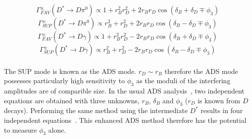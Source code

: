 \documentclass[oneside,12pt]{article}
\begin{document}
  \begin{equation}
		\Gamma_{FAV}^{\pm}(D^{*}\rightarrow D\pi^{0})\propto 1 + r_{B}^{2}r_{D}^{2} + 2r_{B}r_{D}\cos(\delta_{B} + \delta_{D} \mp \phi_{3})
    \label{eq:DecayRateADSFAVpi0}
  \end{equation}
  \begin{equation}
		\Gamma_{SUP}^{\pm}(D^{*}\rightarrow D\pi^{0})\propto r_{B}^{2} + r_{D}^{2} + 2r_{B}r_{D}\cos(\delta_{B} - \delta_{D} \mp \phi_{3})
    \label{eq:DecayRateADSSUPpi0}
  \end{equation}
  \begin{equation}
		\Gamma_{FAV}^{\pm}(D^{*}\rightarrow D\gamma)\propto 1 + r_{B}^{2}r_{D}^{2} - 2r_{B}r_{D}\cos(\delta_{B} + \delta_{D} \mp \phi_{3})
    \label{eq:DecayRateADSFAVgamma}
  \end{equation}
  \begin{equation}
		\Gamma_{SUP}^{\pm}(D^{*}\rightarrow D\gamma)\propto r_{B}^{2} + r_{D}^{2} - 2r_{B}r_{D}\cos(\delta_{B} - \delta_{D} \mp \phi_{3})
    \label{eq:DecayRateADSSUPgamma}
  \end{equation}
\\
\noindent The SUP mode is known as the ADS mode. $r_{D} \sim r_{B}$ therefore the ADS mode possesses particularly high sensitivity to $\phi_3$ as the moduli of the interfering amplitudes are of comparible size. In the usual ADS analysis~\cite{ADSRef}, two independent equations are obtained with three unknowns, $r_B$, $\delta_B$ and $\phi_3$ ($r_{D}$ is known from $D$ decays). Performing the same method using the intermediate $D^*$ results in four independent equations~\cite{ADSDstar}. This enhanced ADS method therefore has the potential to measure $\phi_3$ alone.
\end{document}
